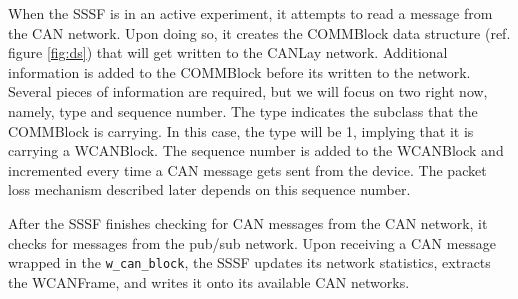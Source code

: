 \documentclass[letterpaper,twocolumn,12pt]{article}
\begin{document}
When the SSSF is in an active experiment, it attempts to read a message from the CAN network. Upon doing so, it creates the COMMBlock data structure (ref. figure \ref{fig:ds}) that will get written to the CANLay network. 
Additional information is added to the COMMBlock before its written to the network. Several pieces of information are required, but we will focus on two right now, namely, type and sequence number.
The type indicates the subclass that the COMMBlock is carrying. In this case, the type will be 1, implying that it is carrying a WCANBlock. 
The sequence number is added to the WCANBlock and incremented every time a CAN message gets sent from the device. 
The packet loss mechanism described later depends on this sequence number. 

After the SSSF finishes checking for CAN messages from the CAN network, it checks for messages from the pub/sub network.
Upon receiving a CAN message wrapped in the \texttt{w\_can\_block}, the SSSF updates its network statistics, extracts the WCANFrame, and writes it onto its available CAN networks.
\end{document}
